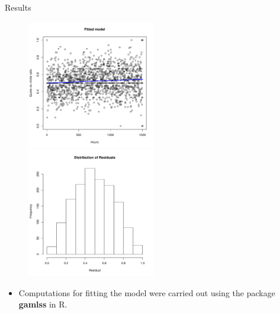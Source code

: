 \documentclass{beamer}
\begin{document}
\begin{frame}{Results}{}
	\begin{figure}
		\begin{itemize}
			\begin{center}
				\vspace*{-0.5in}
				\hspace*{-0.3in}
				\includegraphics[width=0.5\textwidth]{scat_fit.pdf} 
	 			 \includegraphics[width=0.5\textwidth]{res_dist.pdf} 
			\end{center}
		\end{itemize}
	\end{figure}
	\begin{itemize}
		\vspace{-0.25in}
		\item {Computations for fitting the model were carried out using the package \textbf{gamlss} in R.} 
	\end{itemize}
\end{frame}
\end{document}
